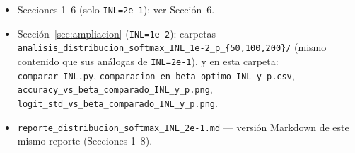 \documentclass[11pt]{article}
\begin{document}
\begin{itemize}
\item Secciones 1--6 (solo \texttt{INL=2e-1}): ver Sección~6.
\item Sección~\ref{sec:ampliacion} (\texttt{INL=1e-2}): carpetas
  \texttt{analisis\_distribucion\_softmax\_INL\_1e-2\_p\_\{50,100,200\}/}
  (mismo contenido que sus análogas de \texttt{INL=2e-1}), y en esta
  carpeta: \texttt{comparar\_INL.py}, \texttt{comparacion\_en\_beta\_optimo\_INL\_y\_p.csv},
  \texttt{accuracy\_vs\_beta\_comparado\_INL\_y\_p.png},
  \texttt{logit\_std\_vs\_beta\_comparado\_INL\_y\_p.png}.
\item \texttt{reporte\_distribucion\_softmax\_INL\_2e-1.md} — versión
  Markdown de este mismo reporte (Secciones 1--8).
\end{itemize}
\end{document}
